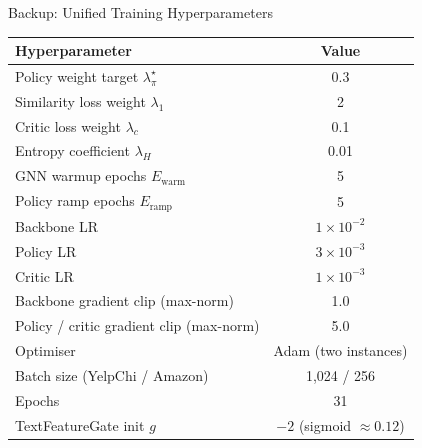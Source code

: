 \documentclass[aspectratio=169,10pt]{beamer}
\begin{document}
\begin{frame}{Backup: Unified Training Hyperparameters}
    \begin{center}\footnotesize
    \begin{tabular}{@{}lc@{}}
        \toprule
        \textbf{Hyperparameter} & \textbf{Value} \\
        \midrule
        Policy weight target $\lambda_\pi^{\star}$       & 0.3 \\
        Similarity loss weight $\lambda_1$                & 2 \\
        Critic loss weight $\lambda_c$                    & 0.1 \\
        Entropy coefficient $\lambda_H$                   & 0.01 \\
        GNN warmup epochs $E_{\text{warm}}$               & 5 \\
        Policy ramp epochs $E_{\text{ramp}}$              & 5 \\
        Backbone LR                                       & $1 \times 10^{-2}$ \\
        Policy LR                                         & $3 \times 10^{-3}$ \\
        Critic LR                                         & $1 \times 10^{-3}$ \\
        Backbone gradient clip (max-norm)                 & 1.0 \\
        Policy / critic gradient clip (max-norm)          & 5.0 \\
        Optimiser                                         & Adam (two instances) \\
        Batch size (YelpChi / Amazon)                     & 1{,}024 / 256 \\
        Epochs                                            & 31 \\
        TextFeatureGate init $g$                          & $-2$ (sigmoid $\approx 0.12$) \\
        \bottomrule
    \end{tabular}
    \end{center}
\end{frame}
\end{document}

